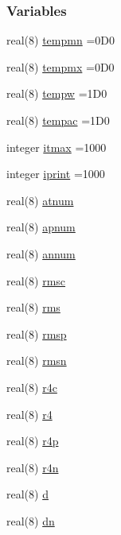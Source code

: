 \subsubsection*{Variables}
\begin{DoxyCompactItemize}
\item 
real(8) \hyperlink{namespaceobserv_a992f70652154733395ffdab398549239}{tempmn} =0\+D0
\item 
real(8) \hyperlink{namespaceobserv_a389e94f4d08c345cc37906dc48289a9d}{tempmx} =0\+D0
\item 
real(8) \hyperlink{namespaceobserv_a844b0f466d0870c37fd460723a96f21c}{tempw} =1\+D0
\item 
real(8) \hyperlink{namespaceobserv_a70b4ab331c460ccbbad144d552722744}{tempac} =1\+D0
\item 
integer \hyperlink{namespaceobserv_a1c1ca20926be13c61016d6ee42c77212}{itmax} =1000
\item 
integer \hyperlink{namespaceobserv_ad0ee4417f363898a68c79a49c0de9280}{iprint} =1000
\item 
real(8) \hyperlink{namespaceobserv_a23f826df2cae1039589aced00fb7939b}{atnum}
\item 
real(8) \hyperlink{namespaceobserv_a1342a598cec837c98c3e43012a6826fe}{apnum}
\item 
real(8) \hyperlink{namespaceobserv_a97c7906f826d0a44d6a25a22fa51ba89}{annum}
\item 
real(8) \hyperlink{namespaceobserv_a69b58be5538a0df79b7663fe1be07b10}{rmsc}
\item 
real(8) \hyperlink{namespaceobserv_a3b3964ead731eed696585a43d22b51f6}{rms}
\item 
real(8) \hyperlink{namespaceobserv_a16ce4982fb88de7727f5d9e0fc731ad7}{rmsp}
\item 
real(8) \hyperlink{namespaceobserv_aa3dc1d3aead73ec11f1d86f5a069d302}{rmsn}
\item 
real(8) \hyperlink{namespaceobserv_a40affdee9346fd5b62a32dff19025a59}{r4c}
\item 
real(8) \hyperlink{namespaceobserv_a763f74159ece0956ce250073d231cee7}{r4}
\item 
real(8) \hyperlink{namespaceobserv_a923afbf28dd2bf131da354abbb1eb785}{r4p}
\item 
real(8) \hyperlink{namespaceobserv_a6e698cb41249db67aa98431cf2b5a4cd}{r4n}
\item 
real(8) \hyperlink{namespaceobserv_aac8164517bfe4101667722dfc46f93f6}{d}
\item 
real(8) \hyperlink{namespaceobserv_aa7d55b64ce5daf1649ee9f05b95088fc}{dn}

\end{DoxyCompactItemize}
